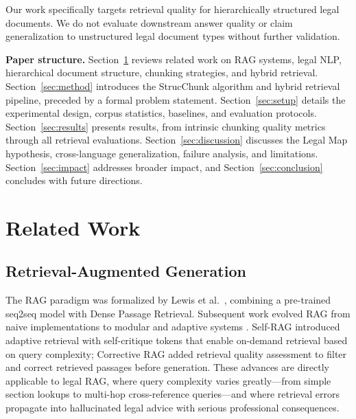 \documentclass[sn-mathphys,Numbered]{sn-jnl}%
\begin{document}
Our work specifically targets retrieval quality for hierarchically
structured legal documents.  We do not evaluate downstream answer quality
or claim generalization to unstructured legal document types without
further validation.

\textbf{Paper structure.}  Section~\ref{sec:related} reviews related work
on RAG systems, legal NLP, hierarchical document structure, chunking
strategies, and hybrid retrieval.  Section~\ref{sec:method} introduces the
StrucChunk algorithm and hybrid retrieval pipeline, preceded by a formal
problem statement.  Section~\ref{sec:setup} details the
experimental design, corpus statistics, baselines, and evaluation protocols.
Section~\ref{sec:results} presents results, from intrinsic chunking quality
metrics through all retrieval evaluations.  Section~\ref{sec:discussion}
discusses the Legal Map hypothesis, cross-language generalization, failure
analysis, and limitations.  Section~\ref{sec:impact} addresses broader
impact, and Section~\ref{sec:conclusion} concludes with future directions.

\section{Related Work}
\label{sec:related}

\subsection{Retrieval-Augmented Generation}

The RAG paradigm was formalized by Lewis et al.~\cite{lewis2021retrievalaugmentedgenerationknowledgeintensivenlp}, combining a
pre-trained seq2seq model with Dense Passage Retrieval.  Subsequent work
evolved RAG from naive implementations to modular and adaptive systems
\cite{gao2024retrievalaugmentedgenerationlargelanguage}.  Self-RAG \cite{asai2023selfraglearningretrievegenerate} introduced
adaptive retrieval with self-critique tokens that enable on-demand retrieval
based on query complexity; Corrective RAG \cite{yan2024correctiveretrievalaugmentedgeneration} added
retrieval quality assessment to filter and correct retrieved passages before
generation.  These advances are directly applicable to legal RAG, where
query complexity varies greatly---from simple section lookups to multi-hop
cross-reference queries---and where retrieval errors propagate into
hallucinated legal advice with serious professional consequences.
\end{document}
